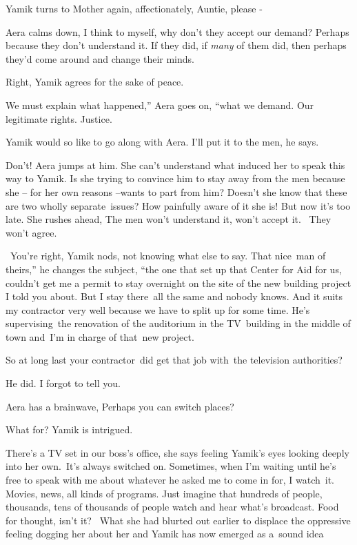 \documentclass[letterpaper]{article}
\begin{document}
Yamik turns to Mother again, affectionately, {\textquotedbl}Auntie, please -{\textquotedbl}\ 

Aera calms down, {\textquotedbl}I think to myself, why don't they accept our demand? Perhaps because they don't
understand it. If they did, if \textit{many} of them did, then perhaps they'd come around and change their
minds.{\textquotedbl} 

{\textquotedbl}Right,{\textquotedbl} Yamik agrees for the sake of peace.

{\textquotedbl}We must explain what happened,'' Aera goes on, ``what we demand. Our legitimate rights.
Justice.{\textquotedbl} 

Yamik would so like to go along with Aera. {\textquotedbl}I'll put it to the men,{\textquotedbl} he says.

{\textquotedbl}Don't!{\textquotedbl} Aera jumps at him. She can't understand what induced her to speak this way to
Yamik. Is she trying to convince him to stay away from the men because she -- for her own reasons --wants to part from
him? Doesn't she know that these are two wholly separate\ issues? How painfully aware of it she is! But now it's too
late. She rushes ahead, {\textquotedbl}The men won't understand it, won't accept it.~ They won't agree.{\textquotedbl} 

~{\textquotedbl}You're right,{\textquotedbl} Yamik nods, not knowing what else to say. {\textquotedbl}That nice\ man of
theirs,'' he changes the subject, ``the one that set up that Center for Aid for us, couldn't get me a permit to stay
overnight on the site of the new building project I told you about. But I stay there~all the same and nobody knows. And
it suits my contractor very well because we have to split up for some time. He's supervising~the renovation of the
auditorium in the TV~building in the middle of town and~I'm in charge of that~new project.{\textquotedbl} 

{\textquotedbl}So at long last your contractor~did get that job with~the television authorities?{\textquotedbl} 

{\textquotedbl}He did. I forgot to tell you.{\textquotedbl} 

Aera has a brainwave, {\textquotedbl}Perhaps you can switch places?{\textquotedbl} 

{\textquotedbl}What for?{\textquotedbl} Yamik is intrigued.

{\textquotedbl}There's a TV set in our boss's office,{\textquotedbl} she says feeling Yamik's eyes looking deeply into
her own.\  {\textquotedbl}It's always switched on. Sometimes, when I'm waiting until he's free to speak with me about
whatever he asked me to come in for, I watch~it. Movies, news, all kinds of programs. Just imagine that hundreds of
people, thousands, tens of thousands of people watch and hear what's broadcast. Food for thought, isn't
it?{\textquotedbl}~ What she had blurted out earlier to displace the oppressive feeling dogging her about her and Yamik
has now emerged as a\ sound idea
\end{document}
